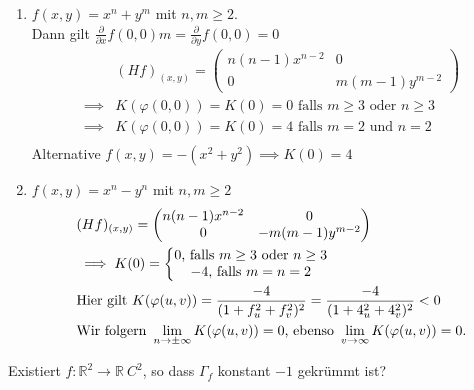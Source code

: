 \documentclass[../main.tex]{subfiles}
\begin{document}
\begin{examples}
    \begin{enumerate} \leavevmode
        \item $f(x,y) = x^{n}+y^{m}$ mit $n,m \geq 2$.\\
        Dann gilt $\frac{\partial}{\partial x}f(0,0)m = \frac{\partial}{\partial y}f(0,0) = 0$ \begin{align*}
            &(Hf)_{(x,y)} = \begin{pmatrix}
                n(n-1)x^{n-2} & 0 \\ 0 & m(m-1)y^{m-2}
            \end{pmatrix}\\
            \implies &K(\varphi(0,0))=K(0)=0 \text{ falls } m\geq 3 \text{ oder } n\geq 3\\
            \implies &K(\varphi(0,0))=K(0)=4 \text{ falls } m = 2 \text{ und } n = 2\\
        \end{align*}
        Alternative $f(x,y) = -(x^{2}+y^{2}) \implies K(0) = 4$
        \item $f(x,y)= x^{n}-y^{n}$ mit $n,m \geq 2$ \begin{align*}
            &(Hf)_{(x,y)}=\begin{pmatrix}
                n(n-1)x^{n-2} & 0\\ 0 & -m(m-1)y^{m-2}
            \end{pmatrix}\\
            &\implies K(0) = \left\{
                \begin{tabular}{@{}c@{}}
                $0 \text{, falls } m\geq 3 \text{ oder } n \geq 3 $\\
                $-4 \text{, falls } m=n=2 $
                \end{tabular}
            \right.\\
            &\text{Hier gilt }K(\varphi(u,v)) = \frac{-4}{(1+f_{u}^{2}+f_{v}^{2})^{2}} = \frac{-4}{(1+4_{u}^{2}+4_{v}^{2})^{2}} < 0\\
            &\text{Wir folgern } \lim\limits_{n\to\pm\infty}K(\varphi(u,v)) = 0 \text{, ebenso } \lim\limits_{v\to\infty}K(\varphi(u,v)) = 0.
        \end{align*}
    \end{enumerate}
\end{examples}
\begin{question}
    Existiert $f:\mathbb{R}^{2}\rightarrow\mathbb{R} \ C^{2}$, so dass $\Gamma_{f}$ konstant $-1$ gekrümmt ist?
\end{question}
\end{document}
